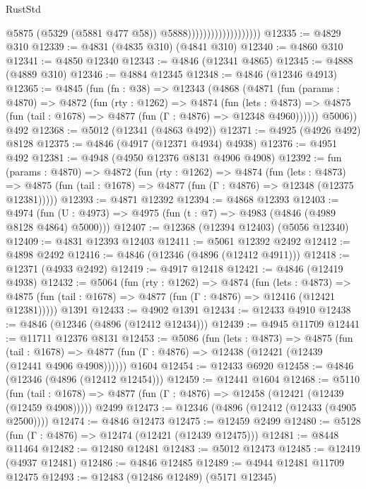 \begin{lexlean}{RustStd}
\begin{coremodule}
                                          @5875
                                          (@5329 (@5881 @477 @58))
                                          @5888)))))))))))))))))))
@12335 := @4829 @310
@12339 := @4831 (@4835 @310) (@4841 @310)
@12340 := @4860 @310
@12341 := @4850 @12340
@12343 := @4846 (@12341 @4865)
@12345 := @4888 (@4889 @310)
@12346 := @4884 @12345
@12348 := @4846 (@12346 @4913)
@12365 := @4845
    (fun (fn : @38) =>
    @12343
      (@4868
        (@4871
          (fun (params : @4870) =>
          @4872
            (fun (rty : @1262) =>
            @4874
              (fun (lets : @4873) =>
              @4875 (fun (tail : @1678) => @4877 (fun (Γ : @4876) => @12348 @4960))))))
        @5006))
    @492
@12368 := @5012 (@12341 (@4863 @492))
@12371 := @4925 (@4926 @492) @8128
@12375 := @4846 (@4917 (@12371 @4934) @4938)
@12376 := @4951 @492
@12381 := @4948 (@4950 @12376 @8131 @4906 @4908)
@12392 := fun (params : @4870) =>
  @4872
    (fun (rty : @1262) =>
    @4874
      (fun (lets : @4873) =>
      @4875 (fun (tail : @1678) => @4877 (fun (Γ : @4876) => @12348 (@12375 @12381)))))
@12393 := @4871 @12392
@12394 := @4868 @12393
@12403 := @4974 (fun (U : @4973) => @4975 (fun (t : @7) => @4983 (@4846 (@4989 @8128 @4864) @5000)))
@12407 := @12368 (@12394 @12403) (@5056 @12340)
@12409 := @4831 @12393 @12403
@12411 := @5061 @12392 @2492
@12412 := @4898 @2492
@12416 := @4846 (@12346 (@4896 (@12412 @4911)))
@12418 := @12371 (@4933 @2492)
@12419 := @4917 @12418
@12421 := @4846 (@12419 @4938)
@12432 := @5064
    (fun (rty : @1262) =>
    @4874
      (fun (lets : @4873) =>
      @4875 (fun (tail : @1678) => @4877 (fun (Γ : @4876) => @12416 (@12421 @12381)))))
    @1391
@12433 := @4902 @1391
@12434 := @12433 @4910
@12438 := @4846 (@12346 (@4896 (@12412 @12434)))
@12439 := @4945 @11709
@12441 := @11711 @12376 @8131
@12453 := @5086
    (fun (lets : @4873) =>
    @4875
      (fun (tail : @1678) =>
      @4877 (fun (Γ : @4876) => @12438 (@12421 (@12439 (@12441 @4906 @4908))))))
    @1604
@12454 := @12433 @6920
@12458 := @4846 (@12346 (@4896 (@12412 @12454)))
@12459 := @12441 @1604
@12468 := @5110
    (fun (tail : @1678) => @4877 (fun (Γ : @4876) => @12458 (@12421 (@12439 (@12459 @4908)))))
    @2499
@12473 := @12346 (@4896 (@12412 (@12433 (@4905 @2500))))
@12474 := @4846 @12473
@12475 := @12459 @2499
@12480 := @5128 (fun (Γ : @4876) => @12474 (@12421 (@12439 @12475)))
@12481 := @8448 @11464
@12482 := @12480 @12481
@12483 := @5012 @12473
@12485 := @12419 (@4937 @12481)
@12486 := @4846 @12485
@12489 := @4944 @12481 @11709 @12475
@12493 := @12483 (@12486 @12489) (@5171 @12345)

\end{coremodule}
\end{lexlean}
